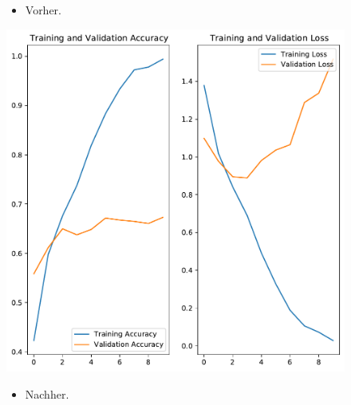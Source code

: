 \documentclass[t]{beamer}
\begin{document}
\begin{frame}
    \begin{figure}
        \begin{minipage}{0.5\textwidth}
            \begin{itemize}
                \item Vorher.
            \end{itemize}
            \includegraphics[width=\textwidth]{./teach-plots/pre_augmentation.pdf}
        \end{minipage}\hfill
        \begin{minipage}{0.5\textwidth}
            \begin{itemize}
                \item Nachher.
            \end{itemize}

\end{minipage}
\end{figure}
\end{frame}
\end{document}

